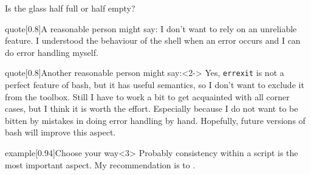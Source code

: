 \begin{frame}{Is the glass half full or half empty?}
    \vspace{-1mm}
    \begin{varblock}{quote}[0.8\textwidth]{A reasonable person might say:}
        I don't want to rely on an unreliable feature.
        I understood the behaviour of the shell when an error occurs and I can do error handling myself.
    \end{varblock}
    \begin{varblock}{quote}[0.8\textwidth]{Another reasonable person might say:}<2->
        Yes, \texttt{errexit} is not a perfect feature of bash, but it has useful semantics, so I don't want to exclude it from the toolbox.
        Still I have to work a bit to get acquainted with all corner cases, but I think it is worth the effort.
        Especially because I do not want to be bitten by mistakes in doing error handling by hand.
        Hopefully, future versions of bash will improve this aspect.
    \end{varblock}
    \begin{varblock}{example}[0.94\textwidth]{Choose your way}<3>
        Probably consistency within a script is the most important aspect.
        My recommendation is to .
    \end{varblock}
    \PrepareURLsymbol[PB]
\end{frame}
